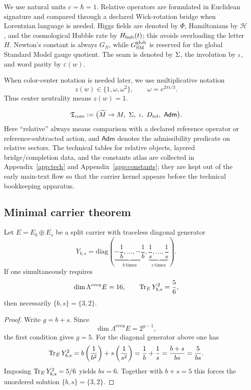 We use natural units $c=\hbar=1$. Relative operators are formulated in Euclidean signature and compared through a declared Wick-rotation bridge when Lorentzian language is needed. Higgs fields are denoted by $\Phi$, Hamiltonians by $\mathcal H$, and the cosmological Hubble rate by $H_{\mathrm{hub}}(t)$; this avoids overloading the letter $H$. Newton's constant is always $G_N$, while $G_{\mathrm{SM}}^{\mathrm{glob}}$ is reserved for the global Standard Model gauge quotient. The seam is denoted by $\Sigma$, the involution by $\iota$, and word parity by $\varepsilon(w)$.

When color-center notation is needed later, we use multiplicative notation
\[
z(w)\in\{1,\omega,\omega^2\},
\qquad
\omega=e^{2\pi i/3}.
\]
Thus center neutrality means $z(w)=1$.

\[
\mathfrak T_{\mathrm{core}}
:=
\bigl(
\widetilde M\to M,\ \Sigma,\ \iota,\ D_{\mathrm{rel}},\ \mathsf{Adm}
\bigr).
\]
Here \enquote{relative} always means comparison with a declared reference operator or reference-subtracted action, and $\mathsf{Adm}$ denotes the admissibility predicate on relative sectors. The technical tables for relative objects, layered bridge/completion data, and the constants atlas are collected in Appendix~\ref{app:tech} and Appendix~\ref{app:constants}; they are kept out of the early main-text flow so that the carrier kernel appears before the technical bookkeeping apparatus.

\subsection{Minimal carrier theorem}
\label{sec:minimal-carrier-proof}

\begin{theorem}
Let $E=E_b\oplus E_s$ be a split carrier with traceless diagonal generator
\[
Y_{b,s}
=
\mathrm{diag}\!\left(
\underbrace{-\frac1b,\ldots,-\frac1b}_{b\ \text{times}},
\underbrace{\frac1s,\ldots,\frac1s}_{s\ \text{times}}
\right).
\]
If one simultaneously requires
\begin{equation}
\label{eq:minimal-carrier-conditions}
\dim \Lambda^{\mathrm{even}}E=16,
\qquad
\operatorname{Tr}_E Y_{b,s}^2=\frac56,
\end{equation}
then necessarily $\{b,s\}=\{3,2\}$.
\end{theorem}

\begin{proof}
Write $g=b+s$. Since
\[
\dim \Lambda^{\mathrm{even}}E=2^{g-1},
\]
the first condition gives $g=5$. For the diagonal generator above one has
\[
\operatorname{Tr}_E Y_{b,s}^2
=
b\left(\frac{1}{b^2}\right)+s\left(\frac{1}{s^2}\right)
=
\frac1b+\frac1s
=
\frac{b+s}{bs}
=
\frac{5}{bs}.
\]
Imposing $\operatorname{Tr}_E Y_{b,s}^2=5/6$ yields $bs=6$. Together with $b+s=5$ this forces the unordered solution $\{b,s\}=\{3,2\}$.
\end{proof}

